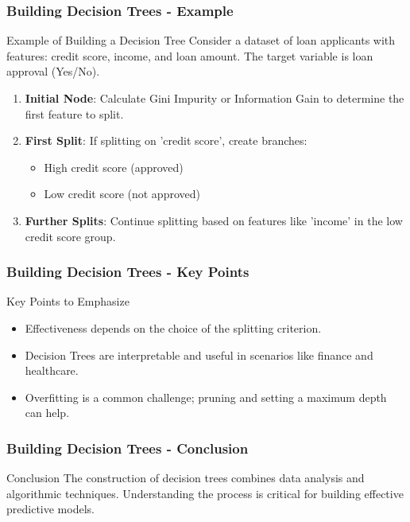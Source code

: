 \documentclass[aspectratio=169]{beamer}
\begin{document}
\begin{frame}[fragile]
    \frametitle{Building Decision Trees - Example}
    \begin{block}{Example of Building a Decision Tree}
        Consider a dataset of loan applicants with features: credit score, income, and loan amount. The target variable is loan approval (Yes/No).
        \begin{enumerate}
            \item \textbf{Initial Node}: Calculate Gini Impurity or Information Gain to determine the first feature to split.
            \item \textbf{First Split}: If splitting on 'credit score', create branches:
                \begin{itemize}
                    \item High credit score (approved)
                    \item Low credit score (not approved)
                \end{itemize}
            \item \textbf{Further Splits}: Continue splitting based on features like 'income' in the low credit score group.
        \end{enumerate}
    \end{block}
\end{frame}

\begin{frame}[fragile]
    \frametitle{Building Decision Trees - Key Points}
    \begin{block}{Key Points to Emphasize}
        \begin{itemize}
            \item Effectiveness depends on the choice of the splitting criterion.
            \item Decision Trees are interpretable and useful in scenarios like finance and healthcare.
            \item Overfitting is a common challenge; pruning and setting a maximum depth can help.
        \end{itemize}
    \end{block}
\end{frame}

\begin{frame}[fragile]
    \frametitle{Building Decision Trees - Conclusion}
    \begin{block}{Conclusion}
        The construction of decision trees combines data analysis and algorithmic techniques. Understanding the process is critical for building effective predictive models.
    \end{block}
\end{frame}
\end{document}
